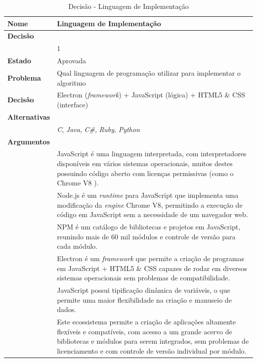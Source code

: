 \documentclass[12pt]{article}
\begin{document}
\begin{table}[H]
	\centering
	\caption{Decisão - Linguagem de Implementação}
	\begin{tabular}{p{3cm} p{11cm}}
		\textbf{Nome}		&	Linguagem de Implementação \\
		\toprule
		\textbf{Decisão}	&   \\
							& 1 \\
		\toprule
		\midrule
		\textbf{Estado}		& Aprovada \\
		\midrule
		\textbf{Problema}	& Qual linguagem de programação utilizar para implementar o algoritmo\\
		\midrule
		\textbf{Decisão}	& Electron (\textit{framework}) + JavaScript (lógica)
							  + HTML5 \& CSS (interface)\\
		\midrule
		\textbf{Alternativas} & \\
		& \textit{C}, \textit{Java}, \textit{C\#}, \textit{Ruby}, \textit{Python} \\
		\midrule
		\textbf{Argumentos} & \\
		& JavaScript é uma linguagem interpretada, com interpretadores disponíveis em vários
		  sistemas operacionais, muitos destes possuindo código aberto com licenças permissivas
		  (como o Chrome V8 \cite{ChromeV8}).\\
		& Node.js \cite{Node.js} é um \textit{runtime} para JavaScript que implementa uma
		  modificação da \textit{engine} Chrome V8, permitindo a execução de código em JavaScript
		  sem a necessidade de um navegador web.\\
		& NPM \cite{NPM} é um catálogo de bibliotecas e projetos em JavaScript, reunindo mais
		  de 60 mil módulos e controle de versão para cada módulo.\\
		& Electron \cite{ElectronJS} é um \textit{framework} que permite a criação de programas
		  em JavaScript + HTML5 \& CSS capazes de rodar em diversos sistemas operacionais 
		  sem problemas de compatibilidade.\\
		& JavaScript possui tipificação dinâmica de variáveis, o que permite uma maior
		  flexibilidade na criação e manuseio de dados.\\
		& Este ecossistema permite a criação de aplicações altamente flexíveis e compatíveis,
		  com acesso a um grande acervo de bibliotecas e módulos para serem integrados,
		  sem problemas de licenciamento e com controle de versão individual por módulo.\\
		\bottomrule
	\end{tabular}		
\end{table}
\end{document}
